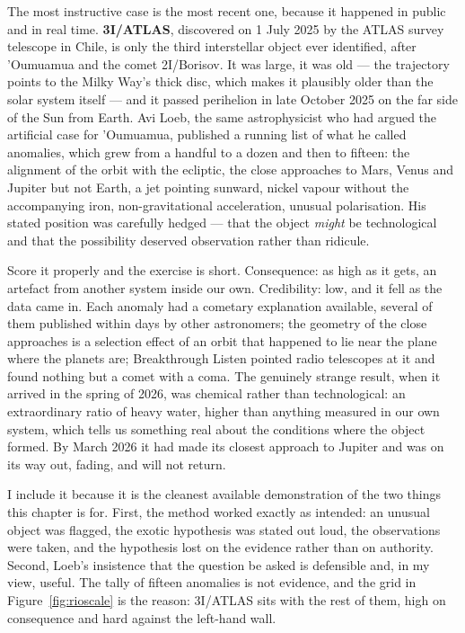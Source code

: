 The most instructive case is the most recent one, because it happened in public and in real
time. \textbf{3I/ATLAS}, discovered on 1 July 2025 by the ATLAS survey telescope in Chile, is
only the third interstellar object ever identified, after 'Oumuamua and the comet 2I/Borisov.
It was large, it was old --- the trajectory points to the Milky Way's thick disc, which makes it
plausibly older than the solar system itself --- and it passed perihelion in late October 2025
on the far side of the Sun from Earth. Avi Loeb, the same astrophysicist who had argued the
artificial case for 'Oumuamua, published a running list of what he called anomalies, which grew
from a handful to a dozen and then to fifteen: the alignment of the orbit with the ecliptic, the
close approaches to Mars, Venus and Jupiter but not Earth, a jet pointing sunward, nickel vapour
without the accompanying iron, non-gravitational acceleration, unusual polarisation. His stated
position was carefully hedged --- that the object \emph{might} be technological and that the
possibility deserved observation rather than ridicule.

Score it properly and the exercise is short. Consequence: as high as it gets, an artefact from
another system inside our own. Credibility: low, and it fell as the data came in. Each anomaly
had a cometary explanation available, several of them published within days by other
astronomers; the geometry of the close approaches is a selection effect of an orbit that happened
to lie near the plane where the planets are; Breakthrough Listen pointed radio telescopes at it
and found nothing but a comet with a coma. The genuinely strange result, when it arrived in the
spring of 2026, was chemical rather than technological: an extraordinary ratio of heavy water,
higher than anything measured in our own system, which tells us something real about the
conditions where the object formed. By March 2026 it had made its closest approach to Jupiter
and was on its way out, fading, and will not return.

I include it because it is the cleanest available demonstration of the two things this chapter is
for. First, the method worked exactly as intended: an unusual object was flagged, the exotic
hypothesis was stated out loud, the observations were taken, and the hypothesis lost on the
evidence rather than on authority. Second,  Loeb's insistence that the question be asked
is defensible and, in my view, useful. The tally of fifteen anomalies is not evidence, and the
grid in Figure~\ref{fig:rioscale} is the reason: 3I/ATLAS sits with the rest of them, high on
consequence and hard against the left-hand wall.

